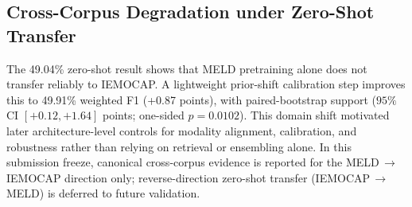 \documentclass[11pt,a4paper,twocolumn]{article}
\begin{document}
\subsection{Cross-Corpus Degradation under Zero-Shot Transfer}
\begin{table}[htbp]
\centering
\small
{}
\caption{Cross-corpus degradation. Zero-shot transfer from MELD to IEMOCAP drops by about 21.43 points in weighted F1 relative to in-domain MELD stacking, exposing structural domain shift.}
\label{tab:cross_corpus_drop}
\end{table}

The 49.04\% zero-shot result shows that MELD pretraining alone does not transfer reliably to IEMOCAP. A lightweight prior-shift calibration step improves this to 49.91\% weighted F1 (+0.87 points), with paired-bootstrap support ($95\%$ CI $[+0.12,+1.64]$ points; one-sided $p=0.0102$). This domain shift motivated later architecture-level controls for modality alignment, calibration, and robustness rather than relying on retrieval or ensembling alone.
In this submission freeze, canonical cross-corpus evidence is reported for the MELD\,$\rightarrow$\,IEMOCAP direction only; reverse-direction zero-shot transfer (IEMOCAP\,$\rightarrow$\,MELD) is deferred to future validation.
\end{document}
